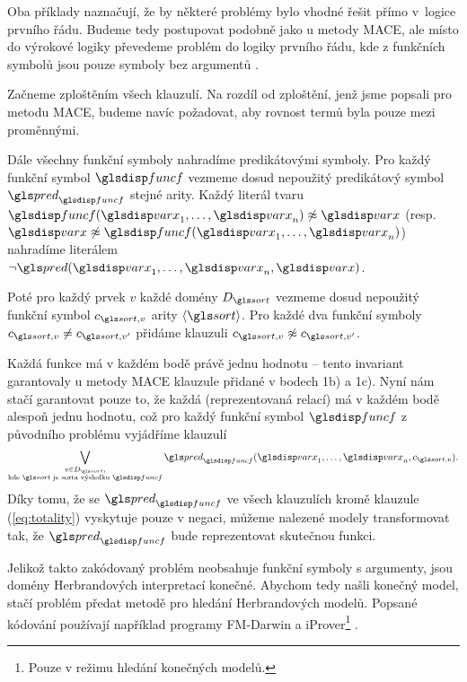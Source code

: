 Oba příklady naznačují, že by některé problémy bylo vhodné řešit
přímo v~logice prvního řádu. Budeme tedy postupovat podobně
jako u metody MACE, ale místo do výrokové logiky převedeme
problém do logiky prvního řádu, kde z funkčních symbolů
jsou pouze symboly bez argumentů \cite{fmdarwin}.

Začneme zploštěním všech klauzulí. Na rozdíl od zploštění,
jenž jsme popsali pro metodu MACE, budeme navíc požadovat, aby
rovnost termů byla pouze mezi proměnnými.

Dále všechny funkční symboly nahradíme predikátovými symboly.
Pro každý funkční symbol $\func$
vezmeme dosud nepoužitý predikátový symbol
$\pred_\func$ stejné arity. Každý literál tvaru
$\func(\var_1 \comdots \var_n) \not\approx \var$
(resp. $\var \not\approx \func(\var_1 \comdots \var_n)$)
nahradíme literálem $\neg \pred(\var_1 \comdots \var_n, \var)$.


Poté pro každý prvek $v$ každé domény $D_\sort$ vezmeme
dosud nepoužitý funkční symbol $c_{\sort, v}$ arity $\langle \sort \rangle$.
Pro každé dva funkční symboly $c_{\sort, v} \neq c_{\sort, v'}$
přidáme klauzuli $c_{\sort, v} \not\approx c_{\sort, v'}$.


Každá funkce má v každém bodě právě jednu hodnotu -- tento
invariant garantovaly u metody MACE klauzule přidané v bodech 1b) a 1c).
Nyní nám stačí garantovat pouze to, že každá 
(reprezentovaná relací) má v každém bodě alespoň jednu hodnotu,
což pro každý funkční symbol $\func$ z původního problému vyjádříme klauzulí
\begin{equation} \label{eq:totality}
  \bigvee_{\substack{v \in D_\sort, \\ \text{kde $\sort$ je sorta výsledku $\func$}}}
    \pred_\func(\var_1 \comdots \var_n, c_{\sort, v}).
\end{equation}
Díky tomu, že se $\pred_\func$ ve všech klauzulích kromě
klauzule (\ref{eq:totality}) vyskytuje pouze v negaci,
můžeme nalezené modely transformovat tak, že $\pred_\func$
bude reprezentovat skutečnou funkci.

Jelikož takto zakódovaný problém neobsahuje funkční symboly
s argumenty, jsou domény Herbrandových interpretací konečné.
Abychom tedy našli konečný model, stačí problém předat metodě
pro hledání Herbrandových modelů.
Popsané kódování používají například programy
FM-Darwin \cite{fmdarwin}
a iProver\footnote{Pouze v režimu hledání konečných modelů.} \cite{iprover}.

